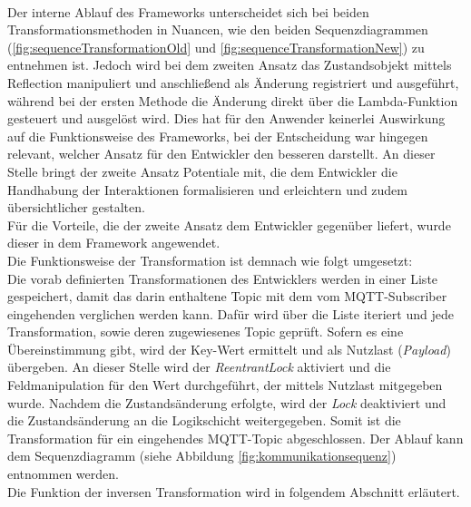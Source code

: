     \\
    Der interne Ablauf des Frameworks unterscheidet sich bei beiden Transformationsmethoden in Nuancen, wie den beiden Sequenzdiagrammen 
    (\ref{fig:sequenceTransformationOld} und \ref{fig:sequenceTransformationNew}) zu entnehmen ist. Jedoch wird bei dem zweiten Ansatz 
    das Zustandsobjekt mittels Reflection manipuliert und anschließend als Änderung registriert und ausgeführt, während bei der ersten Methode 
    die Änderung direkt über die Lambda-Funktion gesteuert und ausgelöst wird. Dies hat für den Anwender keinerlei Auswirkung auf die 
    Funktionsweise des Frameworks, bei der Entscheidung war hingegen relevant, welcher Ansatz für den Entwickler den besseren darstellt. 
    An dieser Stelle bringt der zweite Ansatz Potentiale mit, die dem Entwickler die 
    Handhabung der Interaktionen formalisieren und erleichtern und zudem übersichtlicher gestalten.
    \\
    \linebreak
    Für die Vorteile, die der zweite Ansatz dem Entwickler gegenüber liefert, wurde dieser in dem Framework angewendet. 
    \\
    \linebreak
    Die Funktionsweise der Transformation ist demnach wie folgt umgesetzt:
    \\
    Die vorab definierten Transformationen des Entwicklers werden in einer Liste gespeichert, damit das darin enthaltene Topic mit dem vom \acs{MQTT}-Subscriber eingehenden 
    verglichen werden kann. Dafür wird über die Liste iteriert und jede Transformation, sowie deren zugewiesenes Topic geprüft. Sofern 
    es eine Übereinstimmung gibt, wird der Key-Wert ermittelt und als Nutzlast (\textit{Payload}) übergeben. An dieser Stelle wird der \textit{ReentrantLock} aktiviert 
    und die Feldmanipulation für den Wert durchgeführt, der mittels Nutzlast mitgegeben wurde. Nachdem die Zustandsänderung erfolgte, wird der \textit{Lock} deaktiviert und 
    die Zustandsänderung an die Logikschicht weitergegeben. Somit ist die Transformation für ein eingehendes \acs{MQTT}-Topic abgeschlossen. Der Ablauf kann dem Sequenzdiagramm (siehe Abbildung \ref{fig:kommunikationsequenz}) entnommen werden.  
    \\
    Die Funktion der inversen Transformation wird in folgendem Abschnitt erläutert.

